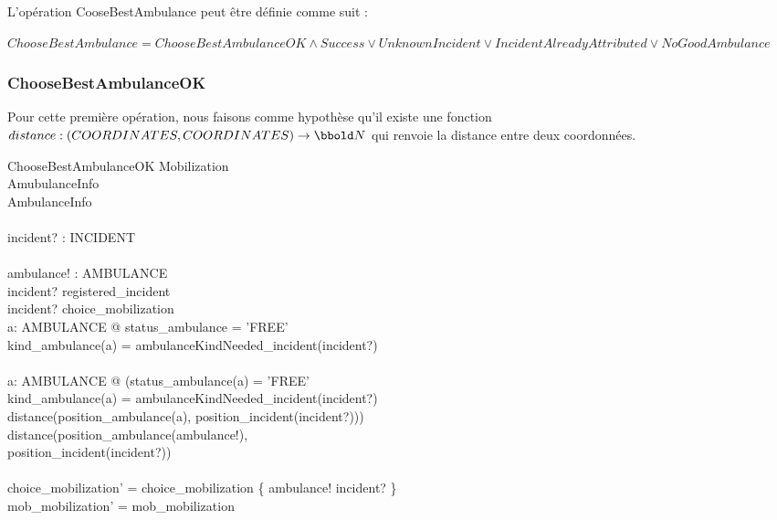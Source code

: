 \documentclass[12pt]{article}
\begin{document}
L'opération CooseBestAmbulance peut être définie comme suit :

	$ChooseBestAmbulance = ChooseBestAmbulanceOK \land Success \lor
	 UnknownIncident \lor IncidentAlreadyAttributed \lor NoGoodAmbulance$

\subsubsection{ChooseBestAmbulanceOK}

Pour cette première opération, nous faisons comme hypothèse qu'il existe une
fonction $distance : (COORDINATES, COORDINATES) \rightarrow \nat$ qui renvoie la 
distance entre deux coordonnées.

\begin{schema}{ChooseBestAmbulanceOK}
	\Delta Mobilization 	\\
	\Xi AmubulanceInfo		\\
	\Xi AmbulanceInfo		\\
	\newline				\\
	incident? : INCIDENT	\\
	\newline				\\
	ambulance! : AMBULANCE	\\
  \where
  	incident? \in registered\_incident \\
  	incident? \notin \ran choice\_mobilization \\
  	\exists a: AMBULANCE @ status\_ambulance = 'FREE' \land \\
  	 kind\_ambulance(a) = ambulanceKindNeeded\_incident(incident?) \\
  	\newline \\
  	\forall a: AMBULANCE @ (status\_ambulance(a) = 'FREE' \land \\
  	 kind\_ambulance(a) = ambulanceKindNeeded\_incident(incident?) \land \\
  	 distance(position\_ambulance(a), position\_incident(incident?))) \\
  	 \geq distance(position\_ambulance(ambulance!), \\
  	 position\_incident(incident?))\\
  	\newline \\
  	choice\_mobilization' = choice\_mobilization \oplus \{ ambulance! \mapsto incident? \} \\
  	mob\_mobilization' = mob\_mobilization
\end{schema}
\end{document}

